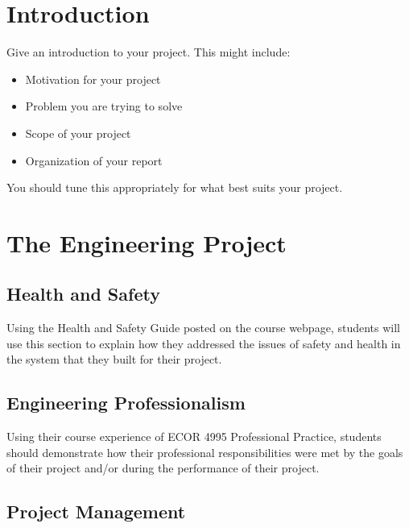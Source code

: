 \documentclass[12pt]{report}
\begin{document}
\chapter{Introduction}

Give an introduction to your project.  This might include:
\begin{itemize}
  \item Motivation for your project
  \item Problem you are trying to solve
  \item Scope of your project
  \item Organization of your report
\end{itemize}
You should tune this appropriately for what best suits your project.



\chapter{The Engineering Project}


\section{Health and Safety}

Using the Health and Safety Guide posted on the course webpage, students will use this section to explain how they addressed the issues of safety and health in the system that they built for their project.


\section{Engineering Professionalism}

Using their course experience of ECOR 4995 Professional Practice, students should demonstrate how their professional responsibilities were met by the goals of their project and/or during the performance of their project. 


\section{Project Management}
\end{document}
